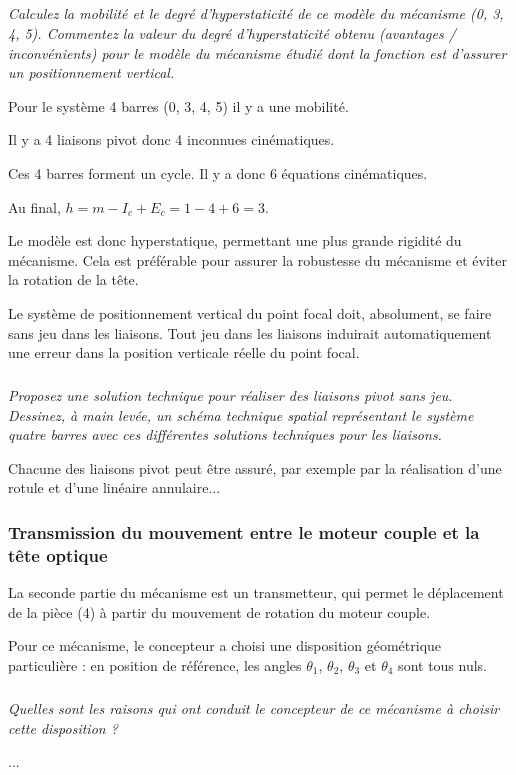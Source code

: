 \subparagraph{\label{q_17}}\textit{Calculez la mobilité et le degré d’hyperstaticité de ce modèle du mécanisme (0, 3, 4, 5).
Commentez la valeur du degré d’hyperstaticité obtenu (avantages / inconvénients) pour le modèle du
mécanisme étudié dont la fonction est d’assurer un positionnement vertical.}
\ifprof
\begin{corrige}
Pour le système 4 barres  (0, 3, 4, 5) il y a une mobilité.

Il y a 4 liaisons pivot donc 4 inconnues cinématiques.

Ces 4 barres forment un cycle. Il y a donc 6 équations cinématiques. 

Au final, $h = m - I_c + E_c = 1-4+6 =3$.

Le modèle est donc hyperstatique, permettant une plus grande rigidité du mécanisme. Cela est préférable pour assurer la robustesse du mécanisme et éviter la rotation de la tête.
\end{corrige}
\else
\fi
\ifprof
\else
Le système de positionnement vertical du point focal doit, absolument, se faire sans jeu dans les liaisons.
Tout jeu dans les liaisons induirait automatiquement une erreur dans la position verticale réelle du point
focal.
\fi

\subparagraph{\label{q_18}}\textit{Proposez une solution technique pour réaliser des liaisons pivot sans jeu.
Dessinez, à main levée, un schéma technique spatial représentant le système quatre barres avec ces
différentes solutions techniques pour les liaisons.}
\ifprof
\begin{corrige}
Chacune des liaisons pivot peut être assuré, par exemple par la réalisation d'une rotule et d'une linéaire annulaire...

\end{corrige}
\else
\fi

\subsubsection{Transmission du mouvement entre le moteur couple et la tête optique}
\ifprof
\else
La seconde partie du mécanisme est un transmetteur, qui permet le déplacement de la pièce (4) à partir du
mouvement de rotation du moteur couple.

Pour ce mécanisme, le concepteur a choisi une disposition géométrique particulière : en position de
référence, les angles $\theta_1$, $\theta_2$, $\theta_3$ et $\theta_4$ sont tous nuls.
\fi

\subparagraph{\label{q_19}}\textit{Quelles sont les raisons qui ont conduit le concepteur de ce mécanisme à choisir cette disposition ?}
\ifprof
\begin{corrige}
...
\end{corrige}
\else
\fi

